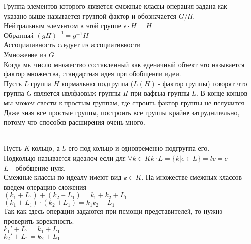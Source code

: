 \begin{defin}
	Группа элементов которого является смежные классы операция задана
	как указано выше называется группой фактор и обозначается $G/H$.\\
	Нейтральным элементом в этой группе $e\cdot H = H$\\
	Обратный $(gH)^{-1} = g^{-1}H$\\
	Ассоциативность следует из ассоциативности\\
	Умножение из $G$\\
	Когда мы число множество составленный как еденичный объект это называется фактор
	множества, стандартная идея при обобщении идеи.\\
	Пусть $L$ группа $H$ нормальная подгруппа ($L(H)$ - фактор группы) говорят что
	группа $G$ является ывлфаовыж группы $H$ при вафвыа группы $L$. В конце концов
	мы можем свести к простым группам, где строить фактор группы не получится.\\

	Даже зная все простые группы, построить все группы крайне затруднительно,
	потому что способов расширения очень много.
\end{defin}

\\

Пусть $K$ кольцо, а $L$ его под кольцо и одновременно подгруппа его.\\
Подкольцо называется идеалом если для $\forall k \in K k\cdot L = \{k|e\in L\}
= lv = c$\\
$L$ - обобщение нуля.\\
Смежные классы по идеалу имеют вид $k\in K$. На множестве смежных классов введем
операцию сложения\\
$(k_1 + L_1) + (k_2 + L_1) = k_1 + k_2 + L_1$\\
$(k_1+L_1)\cdot(k_2+L_1) = k_1 k_2 + L_1$\\
Так как здесь операции задаются при помощи представителей, то нужно проверить
коректность.\\
$k_1' + L_1 = k_1 + L_1$\\
$k_2' + L_1 = k_2 + L_1$\\